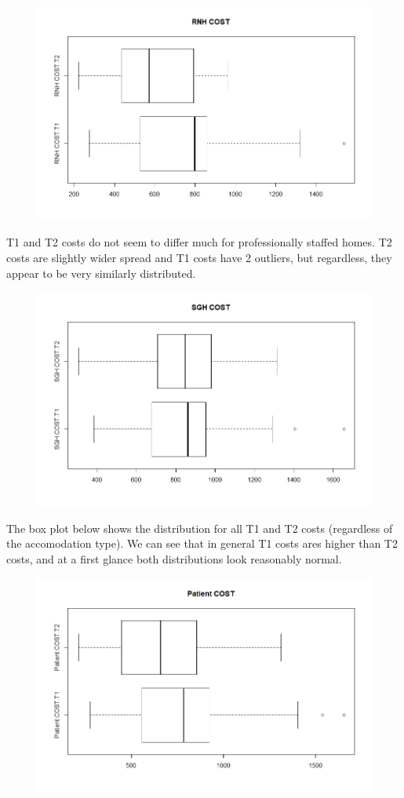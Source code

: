 \documentclass[]{article}
\begin{document}
\begin{figure}[H]
\centering
\includegraphics[width=12cm]{RStudio/jpeg/Box_RNH.jpeg}
\end{figure}
T1 and T2 costs do not seem to differ much for professionally staffed homes. T2 costs are slightly wider spread and T1 costs have 2 outliers, but regardless, they appear to be very similarly distributed.
\begin{figure}[H]
\centering
\includegraphics[width=12cm]{RStudio/jpeg/Box_SGH.jpeg}
\end{figure}
\newpage
The box plot below shows the distribution for all T1 and T2 costs (regardless of the accomodation type). We can see that in general T1 costs ares higher than T2 costs, and at a first glance both distributions look reasonably normal.
\begin{figure}[H]
\centering
\includegraphics[width=12cm]{RStudio/jpeg/Box_COST.jpeg}
\end{figure}
\end{document}
